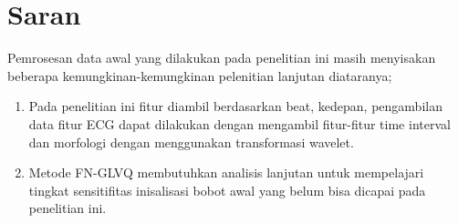 \section{Saran}
Pemrosesan data awal yang dilakukan pada penelitian ini masih menyisakan
beberapa kemungkinan-kemungkinan pelenitian lanjutan diataranya;
\begin{enumerate}
  \item Pada penelitian ini fitur diambil berdasarkan beat, kedepan, pengambilan
  data fitur ECG dapat dilakukan dengan mengambil fitur-fitur time  interval dan
  morfologi dengan menggunakan transformasi wavelet.
  \item Metode FN-GLVQ membutuhkan analisis lanjutan untuk mempelajari tingkat
  sensitifitas inisalisasi bobot awal yang belum bisa dicapai pada penelitian
  ini.
\end{enumerate}
